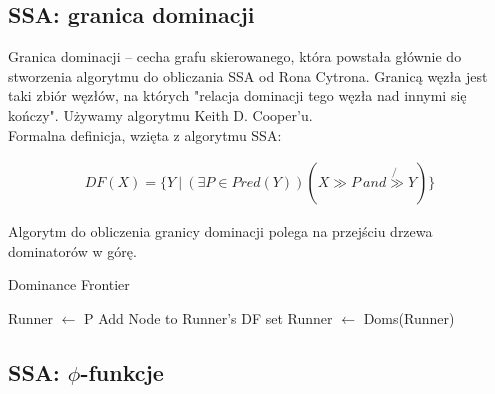 	\subsection{SSA: granica dominacji}
	
	    Granica dominacji -- cecha grafu skierowanego, która powstała głównie do stworzenia algorytmu
	    do obliczania SSA od Rona Cytrona. Granicą węzła jest taki zbiór węzłów, na których
	    "relacja dominacji tego węzła nad innymi się kończy". Używamy algorytmu Keith D. Cooper'u.
	    \\
	    
	    Formalna definicja, wzięta z algorytmu SSA:

		\begin{equation*}
		\begin{split}
			DF(X) = \{ Y \ | \ (\exists P \in Pred(Y)) (X \gg P \ and \not{\gg} Y) \}
		\end{split}
		\end{equation*}

        Algorytm do obliczenia granicy dominacji polega na przejściu drzewa dominatorów w górę.
	
		\begin{algorithm}
			\caption{Dominance Frontier}
			\begin{algorithmic}[1]

			        \State Runner $\gets$ P
			            \State Add Node to Runner's DF set
			            \State Runner $\gets$ Doms(Runner)
			        \EndWhile
			        \EndFor
			    \EndIf
			\EndProcedure

			\end{algorithmic}
		\end{algorithm}

	\subsection{SSA: $\phi$-funkcje}
